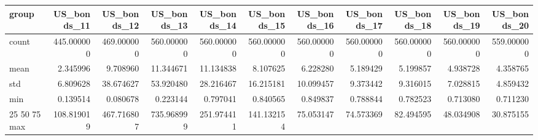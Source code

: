 \begin{tabular}{lrrrrrrrrrr}
\toprule
group & US_bonds_11 & US_bonds_12 & US_bonds_13 & US_bonds_14 & US_bonds_15 & US_bonds_16 & US_bonds_17 & US_bonds_18 & US_bonds_19 & US_bonds_20 \\
\midrule
count & 445.000000 & 469.000000 & 560.000000 & 560.000000 & 560.000000 & 560.000000 & 560.000000 & 560.000000 & 560.000000 & 559.000000 \\
mean & 2.345996 & 9.708960 & 11.344671 & 11.134838 & 8.107625 & 6.228280 & 5.189429 & 5.199857 & 4.938728 & 4.358765 \\
std & 6.809628 & 38.674627 & 53.920480 & 28.216467 & 16.215181 & 10.099457 & 9.373442 & 9.316015 & 7.028815 & 4.859432 \\
min & 0.139514 & 0.080678 & 0.223144 & 0.797041 & 0.840565 & 0.849837 & 0.788844 & 0.782523 & 0.713080 & 0.711230 \\
25%
50%
75%
max & 108.819019 & 467.716807 & 735.968999 & 251.974411 & 141.132154 & 75.053147 & 74.573369 & 82.494595 & 48.034908 & 30.875155 \\
\bottomrule
\end{tabular}
